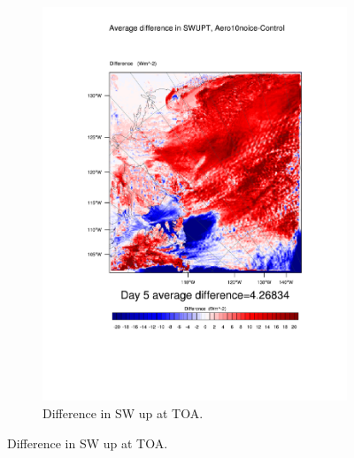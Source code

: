 \begin{figure}
\begin{subfigure}{0.48\textwidth}
		\includegraphics[width=\textwidth]{results/aero10ni/diff_Aero10NoIce_SWUPT_Day5.pdf}
		\caption{Difference in SW up at TOA.}
		\label{subfig:swup_r4Day5}
	\end{subfigure}
	

\end{figure}
